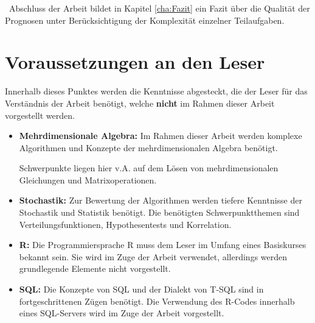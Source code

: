 ~\newline Abschluss der Arbeit bildet in Kapitel \ref{cha:Fazit} ein Fazit über die Qualität der Prognosen unter Berücksichtigung der Komplexität einzelner Teilaufgaben.
\section{Voraussetzungen an den Leser}
\label{sec:Vorraussetzungen}
Innerhalb dieses Punktes werden die Kenntnisse abgesteckt, die der Leser für das Verständnis der Arbeit benötigt, welche \textbf{nicht} im Rahmen dieser Arbeit vorgestellt werden. 

\begin{itemize}
	\item \textbf{Mehrdimensionale Algebra:} Im Rahmen dieser Arbeit werden komplexe Algorithmen und Konzepte der mehrdimensionalen Algebra benötigt. 
	
	Schwerpunkte liegen hier v.A. auf dem Lösen von mehrdimensionalen Gleichungen und Matrixoperationen.
	\item \textbf{Stochastik:}  Zur Bewertung der Algorithmen werden tiefere Kenntnisse der Stochastik und Statistik benötigt. Die benötigten Schwerpunktthemen sind Verteilungsfunktionen, Hypothesentests und Korrelation.
	\item \textbf{R:} Die Programmiersprache R muss dem Leser im Umfang eines Basiskurses bekannt sein. Sie wird im Zuge der Arbeit verwendet, allerdings werden grundlegende Elemente nicht vorgestellt. 
	\item \textbf{SQL:} Die Konzepte von SQL und der Dialekt von T-SQL sind in fortgeschrittenen Zügen benötigt. Die Verwendung des R-Codes innerhalb eines SQL-Servers wird im Zuge der Arbeit vorgestellt. 
\end{itemize}
